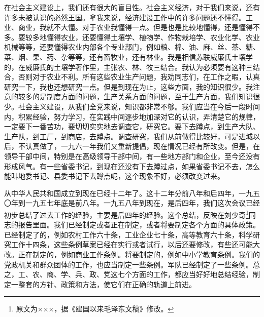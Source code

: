 在社会主义建设上，我们还有很大的盲目性。社会主义经济，对于我们来说，还有许多未被认识的必然王国。拿我来说，经济建设工作中的许多问题还不懂得。工业、商业，我就不大懂。对于农业我懂得一点。但是也是比较地懂得，还是懂得不多。要较多地懂得农业，还要懂得土壤学、植物学、作物栽培学、农业化学、农业机械等等，还要懂得农业内部各个专业部门，例如粮、棉、油、麻、丝、茶、糖、菜、烟、果、药、杂等等，还有畜牧业，还有林业。我是相信苏联威廉氏土壤学的，在威廉氏的土壤学著作里，主张农、林、牧三结合。我认为必须要有这种三结合，否则对于农业不利。所有这些农业生产问题，我劝同志们，在工作之暇，认真研究一下，我也还想研究一点。但是到现在为止，这些方面，我的知识很少。我注意的较多的是制度方面的问题，生产关系方面的问题，至于生产方面，我们知识很少。社会主义建设，从我们全党来说，知识都非常不够。我们应当在今后一段时间内，积累经验，努力学习，在实践中间逐步地加深对它的认识，弄清楚它的规律，一定要下一番苦功，要切切实实地去调查它，研究它。要下去蹲点，到生产大队、生产队，到工厂，到商店，去蹲点。调查研究，我们从前做得比较好，可是进城以后，不认真做了，一九六一年我们又重新提倡，现在情况已经有所改变。但是，在领导干部中间，特别是在高级领导干部中间，有一些地方部门和企业，至今还没有形成风气。有一些省委书记，到现在还没有下去蹲过点，如果省委书记不去，怎么能叫地委书记、县委书记下去蹲点呢，这个现象不好，必须改变过来。

从中华人民共和国成立到现在已经十二年了。这十二年分前八年和后四年，一九五〇年到一九五七年底是前八年。一九五八年到现在，是后四年，我们这次会议已经初步总结了过去工作的经验，主要是后四年的经验。这个总结，反映在刘少奇\footnote{原文为×××，据《建国以来毛泽东文稿》修改。}同志的报告里面。我们已经制定或者正在制定，或者将要制定各个方面的具体政策。已经制定了的，例如农村工作六十条，工业企业七十条，高等教育六十条，科学研究工作十四条，这些条例草案已经在实行或者试行，以后还要修改，有些还可能大改。正在制定的，例如商业工作条例。将要制定的，例如中小学教育条例。我们的党政机关和群众团体的工作，也应当制定一些条例。军队已经制定了一些条例。总之，工、农、商、学、兵、政、党这七个方面的工作，都应当好好地总结经验，制定一整套的方针、政策和方法，使它们在正确的轨道上前进。

